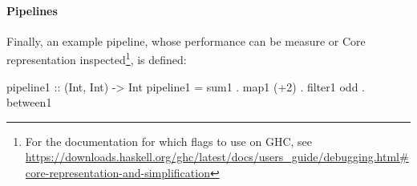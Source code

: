 \paragraph{Pipelines} Finally, an example pipeline, whose performance can be measure or Core representation inspected\footnote{For the documentation for which flags to use on GHC, see \url{https://downloads.haskell.org/ghc/latest/docs/users_guide/debugging.html\#core-representation-and-simplification}}, is defined:
\begin{code}
pipeline1 :: (Int, Int) -> Int
pipeline1 = sum1 . map1 (+2) . filter1 odd . between1
\end{code}
